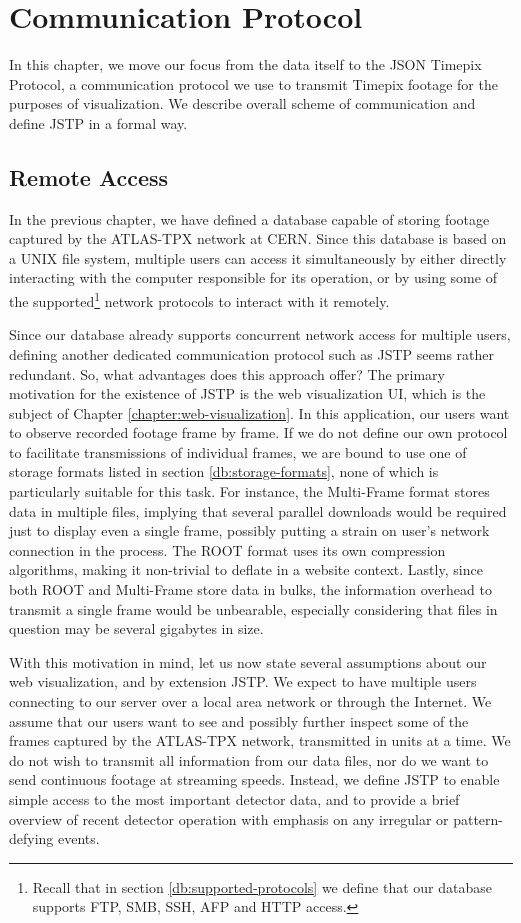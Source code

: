 \chapter{Communication Protocol}
\label{protocol:introduction}

In this chapter, we move our focus from the data itself to the JSON Timepix Protocol, a communication protocol we use to transmit Timepix footage for the purposes of visualization. We describe overall scheme of communication and define JSTP in a formal way.

\section{Remote Access}
In the previous chapter, we have defined a database capable of storing footage captured by the ATLAS-TPX network at CERN. Since this database is based on a UNIX file system, multiple users can access it simultaneously by either directly interacting with the computer responsible for its operation, or by using some of the supported\footnote{Recall that in section \ref{db:supported-protocols} we define that our database supports FTP, SMB, SSH, AFP and HTTP access.} network protocols to interact with it remotely.

Since our database already supports concurrent network access for multiple users, defining another dedicated communication protocol such as JSTP seems rather redundant. So, what advantages does this approach offer? The primary motivation for the existence of JSTP is the web visualization UI, which is the subject of Chapter \ref{chapter:web-visualization}. In this application, our users want to observe recorded footage frame by frame. If we do not define our own protocol to facilitate transmissions of individual frames, we are bound to use one of storage formats listed in section \ref{db:storage-formats}, none of which is particularly suitable for this task. For instance, the Multi-Frame format stores data in multiple files, implying that several parallel downloads would be required just to display even a single frame, possibly putting a strain on user's network connection in the process. The ROOT format uses its own compression algorithms, making it non-trivial to deflate in a website context. Lastly, since both ROOT and Multi-Frame store data in bulks, the information overhead to transmit a single frame would be unbearable, especially considering that files in question may be several gigabytes in size.

With this motivation in mind, let us now state several assumptions about our web visualization, and by extension JSTP. We expect to have multiple users connecting to our server over a local area network or through the Internet. We assume that our users want to see and possibly further inspect some of the frames captured by the ATLAS-TPX network, transmitted in units at a time. We do not wish to transmit all information from our data files, nor do we want to send continuous footage at streaming speeds. Instead, we define JSTP to enable simple access to the most important detector data, and to provide a brief overview of recent detector operation with emphasis on any irregular or pattern-defying events.

